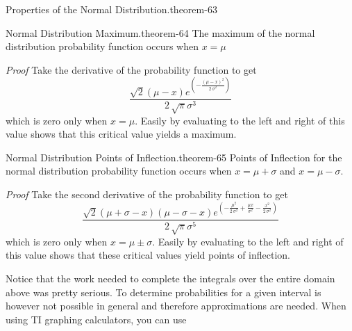 \documentclass[10pt,]{book}
\makeatletter
\renewcommand*{\proofname}{Proof}
\renewenvironment{proof}[1][\proofname]{\par
  \pushQED{\qed}%
  \normalfont \topsep6\p@\@plus6\p@\relax
  \trivlist
  \item\relax
    {\itshape
    #1\@addpunct{.}}\hspace\labelsep\ignorespaces
}{%
  \popQED\endtrivlist\@endpefalse
}
\numberwithin{equation}{section}
\makeatother
\begin{document}
%
\par
\hypertarget{p-1036}{}%
\begin{theorem}{Properties of the Normal Distribution.}{}{theorem-63}%
\end{theorem}
%
\par
\hypertarget{p-1037}{}%
\begin{theorem}{Normal Distribution Maximum.}{}{theorem-64}%
\hypertarget{p-1038}{}%
The maximum of the normal distribution probability function occurs when \(x = \mu\)%
\end{theorem}
\begin{proof}\hypertarget{proof-65}{}
\hypertarget{p-1039}{}%
Take the derivative of the probability function to get%
\begin{equation*}
\frac{\sqrt{2} {\left(\mu - x\right)} e^{\left(-\frac{{\left(\mu - x\right)}^{2}}{2 \, \sigma^{2}}\right)}}{2 \, \sqrt{\pi} \sigma^{3}}
\end{equation*}
which is zero only when \(x = \mu\).  Easily by evaluating to the left and right of this value shows that this critical value yields a maximum.%
\end{proof}
%
\par
\hypertarget{p-1040}{}%
\begin{theorem}{Normal Distribution Points of Inflection.}{}{theorem-65}%
\hypertarget{p-1041}{}%
Points of Inflection for the normal distribution probability function occurs when \(x = \mu + \sigma\) and \(x = \mu - \sigma\).%
\end{theorem}
\begin{proof}\hypertarget{proof-66}{}
\hypertarget{p-1042}{}%
Take the second derivative of the probability function to get%
\begin{equation*}
\frac{\sqrt{2} {\left(\mu + \sigma - x\right)} {\left(\mu - \sigma - x\right)} e^{\left(-\frac{\mu^{2}}{2 \, \sigma^{2}} + \frac{\mu x}{\sigma^{2}} - \frac{x^{2}}{2 \, \sigma^{2}}\right)}}{2 \, \sqrt{\pi} \sigma^{5}}
\end{equation*}
which is zero only when \(x = \mu \pm \sigma\).  Easily by evaluating to the left and right of this value shows that these critical values yield points of inflection.%
\end{proof}
%
\par
\hypertarget{p-1043}{}%
Notice that the work needed to complete the integrals over the entire domain above was pretty serious. To determine probabilities for a given interval is however not possible in general and therefore approximations are needed. When using TI graphing calculators, you can use%
\end{document}
